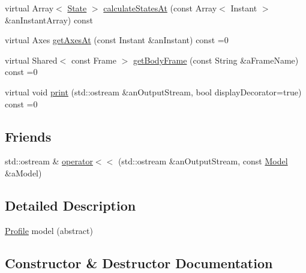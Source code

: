 \begin{DoxyCompactItemize}
\item 
virtual Array$<$ \hyperlink{classostk_1_1astro_1_1flight_1_1profile_1_1_state}{State} $>$ \hyperlink{classostk_1_1astro_1_1flight_1_1profile_1_1_model_ab81349e148cc39ad5662f7181f146493}{calculate\+States\+At} (const Array$<$ Instant $>$ \&an\+Instant\+Array) const
\item 
virtual Axes \hyperlink{classostk_1_1astro_1_1flight_1_1profile_1_1_model_ab18bd79e421c36df4ab716649ce549cd}{get\+Axes\+At} (const Instant \&an\+Instant) const =0
\item 
virtual Shared$<$ const Frame $>$ \hyperlink{classostk_1_1astro_1_1flight_1_1profile_1_1_model_a04ded49c09d9a44820251c48f47d0ffa}{get\+Body\+Frame} (const String \&a\+Frame\+Name) const =0
\item 
virtual void \hyperlink{classostk_1_1astro_1_1flight_1_1profile_1_1_model_ad9bb86b1869150e2bd970e9fa59ce36e}{print} (std\+::ostream \&an\+Output\+Stream, bool display\+Decorator=true) const =0
\end{DoxyCompactItemize}
\subsection*{Friends}
\begin{DoxyCompactItemize}
\item 
std\+::ostream \& \hyperlink{classostk_1_1astro_1_1flight_1_1profile_1_1_model_a68240493d08f91f6613186eb52823e85}{operator$<$$<$} (std\+::ostream \&an\+Output\+Stream, const \hyperlink{classostk_1_1astro_1_1flight_1_1profile_1_1_model}{Model} \&a\+Model)
\end{DoxyCompactItemize}


\subsection{Detailed Description}
\hyperlink{classostk_1_1astro_1_1flight_1_1_profile}{Profile} model (abstract) 

\subsection{Constructor \& Destructor Documentation}
\mbox{\label{classostk_1_1astro_1_1flight_1_1profile_1_1_model_a6301933ec5ccdd9dab16fa8ecbf73869}} 
